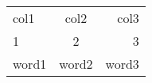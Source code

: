 \begin{tabular}{|l|c|r|}
\hline
col1 & col2 & col3 \\ 
1 & 2 & 3 \\ 
word1 & word2 & word3 \\
\hline 
\end{tabular}